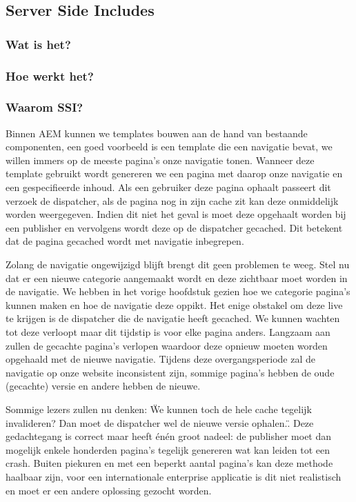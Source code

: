 \documentclass{article}
\begin{document}
	\subsection{Server Side Includes} 
	\subsubsection{Wat is het?}
	
	\subsubsection{Hoe werkt het?}
	
	\subsubsection{Waarom SSI?}
    Binnen AEM kunnen we templates bouwen aan de hand van bestaande componenten, een goed voorbeeld is een template die een navigatie bevat, we willen immers op de meeste pagina's onze navigatie tonen. Wanneer deze template gebruikt wordt genereren we een pagina met daarop onze navigatie en een gespecifieerde inhoud. Als een gebruiker deze pagina ophaalt passeert dit verzoek de dispatcher, als de pagina nog in zijn cache zit kan deze onmiddelijk worden weergegeven. Indien dit niet het geval is moet deze opgehaalt worden bij een publisher en vervolgens wordt deze op de dispatcher gecached. Dit betekent dat de pagina gecached wordt met navigatie inbegrepen. 
    \par
    Zolang de navigatie ongewijzigd blijft brengt dit geen problemen te weeg. Stel nu dat er een nieuwe categorie aangemaakt wordt en deze zichtbaar moet worden in de navigatie. We hebben in het vorige hoofdstuk gezien hoe we categorie pagina's kunnen maken en hoe de navigatie deze oppikt. Het enige obstakel om deze live te krijgen is de dispatcher die de navigatie heeft gecached. We kunnen wachten tot deze verloopt maar dit tijdstip is voor elke pagina anders. Langzaam aan zullen de gecachte pagina's verlopen waardoor deze opnieuw moeten worden opgehaald met de nieuwe navigatie. Tijdens deze overgangsperiode zal de navigatie op onze website inconsistent zijn, sommige pagina's hebben de oude (gecachte) versie en andere hebben de nieuwe.
    \par
    Sommige lezers zullen nu denken: \"We kunnen toch de hele cache tegelijk invalideren? Dan moet de dispatcher wel de nieuwe versie ophalen.\". Deze gedachtegang is correct maar heeft \'en\'en groot nadeel: de publisher moet dan mogelijk enkele honderden pagina's tegelijk genereren wat kan leiden tot een crash. Buiten piekuren en met een beperkt aantal pagina's kan deze methode haalbaar zijn, voor een internationale enterprise applicatie is dit niet realistisch en moet er een andere oplossing gezocht worden.
\end{document}
